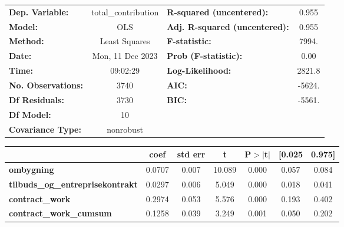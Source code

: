 \begin{center}
\begin{tabular}{lclc}
\toprule
\textbf{Dep. Variable:}                   & total\_contribution & \textbf{  R-squared (uncentered):}      &     0.955   \\
\textbf{Model:}                           &         OLS         & \textbf{  Adj. R-squared (uncentered):} &     0.955   \\
\textbf{Method:}                          &    Least Squares    & \textbf{  F-statistic:       }          &     7994.   \\
\textbf{Date:}                            &   Mon, 11 Dec 2023  & \textbf{  Prob (F-statistic):}          &     0.00    \\
\textbf{Time:}                            &       09:02:29      & \textbf{  Log-Likelihood:    }          &    2821.8   \\
\textbf{No. Observations:}                &          3740       & \textbf{  AIC:               }          &    -5624.   \\
\textbf{Df Residuals:}                    &          3730       & \textbf{  BIC:               }          &    -5561.   \\
\textbf{Df Model:}                        &            10       & \textbf{                     }          &             \\
\textbf{Covariance Type:}                 &      nonrobust      & \textbf{                     }          &             \\
\bottomrule
\end{tabular}
\begin{tabular}{lcccccc}
                                          & \textbf{coef} & \textbf{std err} & \textbf{t} & \textbf{P$> |$t$|$} & \textbf{[0.025} & \textbf{0.975]}  \\
\midrule
\textbf{ombygning}                        &       0.0707  &        0.007     &    10.089  &         0.000        &        0.057    &        0.084     \\
\textbf{tilbuds\_og\_entreprisekontrakt}  &       0.0297  &        0.006     &     5.049  &         0.000        &        0.018    &        0.041     \\
\textbf{contract\_work}                   &       0.2974  &        0.053     &     5.576  &         0.000        &        0.193    &        0.402     \\
\textbf{contract\_work\_cumsum}           &       0.1258  &        0.039     &     3.249  &         0.001        &        0.050    &        0.202     \\

\end{tabular}
\end{center}
